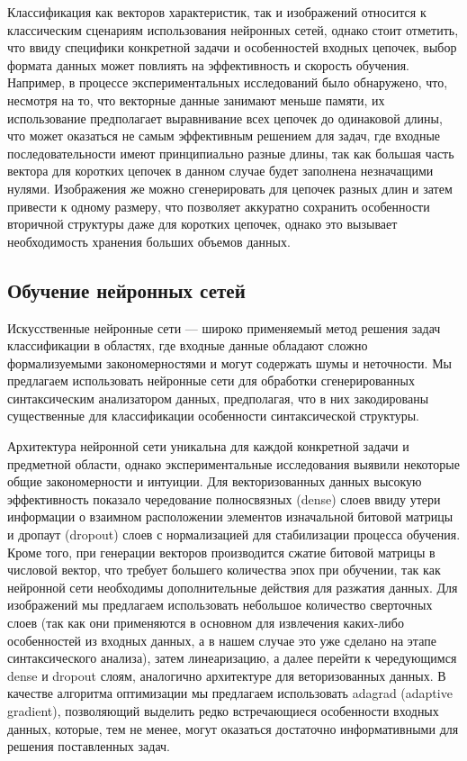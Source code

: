 Классификация как векторов характеристик, так и изображений относится к классическим сценариям использования нейронных сетей, однако стоит отметить, что ввиду специфики конкретной задачи и особенностей входных цепочек, выбор формата данных может повлиять на эффективность и скорость обучения. Например, в процессе экспериментальных исследований было обнаружено, что, несмотря на то, что векторные данные занимают меньше памяти, их использование предполагает выравнивание всех цепочек до одинаковой длины, что может оказаться не самым эффективным решением для задач, где входные последовательности имеют принципиально разные длины, так как большая часть вектора для коротких цепочек в данном случае будет заполнена незначащими нулями. Изображения же можно сгенерировать для цепочек разных длин и затем привести к одному размеру, что позволяет аккуратно сохранить особенности вторичной структуры даже для коротких цепочек, однако это вызывает необходимость хранения больших объемов данных.

\subsection{Обучение нейронных сетей}
Искусственные нейронные сети --- широко применяемый метод решения задач классификации в областях, где входные данные обладают сложно формализуемыми закономерностями и могут содержать шумы и неточности. Мы предлагаем использовать нейронные сети для обработки сгенерированных синтаксическим анализатором данных, предполагая, что в них закодированы существенные для классификации особенности синтаксической структуры.

Архитектура нейронной сети уникальна для каждой конкретной задачи и предметной области, однако экспериментальные исследования выявили некоторые общие закономерности и интуиции. Для векторизованных данных высокую эффективность показало чередование полносвязных (dense) слоев ввиду утери информации о взаимном расположении элементов изначальной битовой матрицы и дропаут (dropout) слоев с нормализацией для стабилизации процесса обучения. Кроме того, при генерации векторов производится сжатие битовой матрицы в числовой вектор, что требует большего количества эпох при обучении, так как нейронной сети необходимы дополнительные действия для разжатия данных. Для изображений мы предлагаем использовать небольшое количество сверточных слоев (так как они применяются в основном для извлечения каких-либо особенностей из входных данных, а в нашем случае это уже сделано на этапе синтаксического анализа), затем линеаризацию, а далее перейти к чередующимся dense и dropout слоям, аналогично архитектуре для веторизованных данных. В качестве алгоритма оптимизации мы предлагаем использовать adagrad (adaptive gradient), позволяющий выделить редко встречающиеся особенности входных данных, которые, тем не менее, могут оказаться достаточно информативными для решения поставленных задач.

